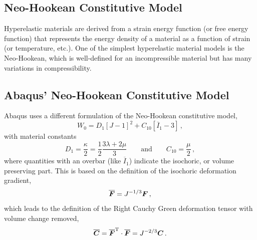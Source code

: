 \documentclass[10pt,letterpaper,oneside]{report}
\newcommand{\ten}[1]{\mbox{\boldmath $#1$}{}}
\newcommand{\scas}[1]{\mbox{{\scriptsize{${\rm{#1}}$}}}{}}
\begin{document}
\begin{itemize}
\section{Neo-Hookean Constitutive Model} 
Hyperelastic materials are derived from a strain energy function (or free energy function) that represents the energy density of a material as a function of strain (or temperature, etc.).  One of the simplest hyperelastic material models is the Neo-Hookean, which is well-defined for an incompressible material but has many variations in compressibility.  

\subsection{Abaqus' Neo-Hookean Constitutive Model}
Abaqus uses a different formulation of the Neo-Hookean constitutive model, 
\begin{equation}
W_0 = D_1 \left[ J - 1 \right]^2 + C_{10} \left[ \overline{I}_1 - 3 \right] \, , 
\end{equation}
with material constants  
\begin{equation}
D_1 = \frac{\kappa}{2} = \frac{1}{2} \frac{3 \lambda + 2 \mu}{3} 
\qquad \mbox{and} \qquad
C_{10} = \frac{\mu}{2} \, ,
\end{equation}
where quantities with an overbar (like $\overline{I}_1$) indicate the isochoric, or volume preserving part.  This is based on the definition of the isochoric deformation gradient,
\begin{equation}
\overline{ \ten{F} } = J^{-1/3} \ten{F} \, , 
\end{equation}
which leads to the definition of the Right Cauchy Green deformation tensor with volume change removed, 
\begin{equation}
\overline{ \ten{C} } = \overline{ \ten{F} }^{\scas{T}} \cdot \overline{ \ten{F} } = J^{-2/3} \ten{C} \, . 
\end{equation}



\end{itemize}
\end{document}
